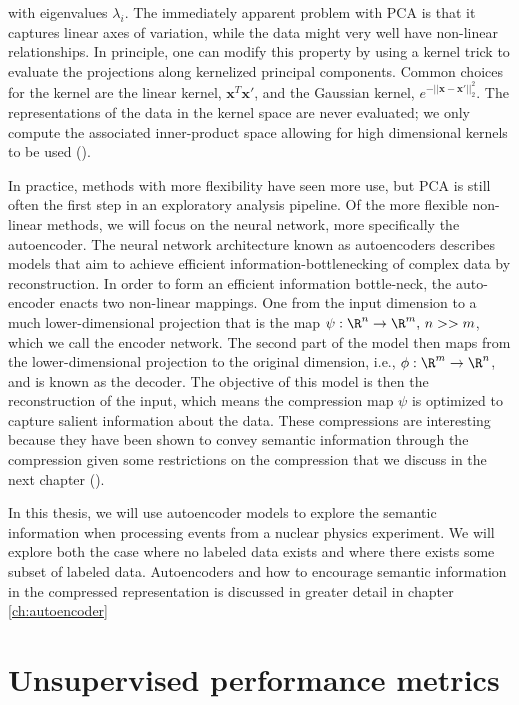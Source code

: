 \noindent with eigenvalues $\lambda_i$. The immediately apparent problem with PCA is that it captures linear axes of variation, while the data might very well have non-linear relationships. In principle, one can modify this property by using a kernel trick to evaluate the projections along kernelized principal components. Common choices for the kernel are the linear kernel, $\mathbf{x}^T\mathbf{x}'$, and the Gaussian kernel, $e^{-||\mathbf{x} - \mathbf{x}'||^2_2}$. The representations of the data in the kernel space are never evaluated; we only compute the associated inner-product space allowing for high dimensional kernels to be used (\cite{Scholkopf1996}). 

In practice, methods with more flexibility have seen more use, but PCA is still often the first step in an exploratory analysis pipeline. Of the more flexible non-linear methods, we will focus on the neural network, more specifically the autoencoder. The neural network architecture known as autoencoders describes models that aim to achieve efficient information-bottlenecking of complex data by reconstruction. In order to form an efficient information bottle-neck, the auto-encoder enacts two non-linear mappings. One from the input dimension to a much lower-dimensional projection that is the map $\psi: \R^n \rightarrow \R^m,\, n >> m$, which we call the encoder network. The second part of the model then maps from the lower-dimensional projection to the original dimension, i.e., $\phi: \R^m \rightarrow \R^n$, and is known as the decoder. The objective of this model is then the reconstruction of the input, which means the compression map $\psi$ is optimized to capture salient information about the data. These compressions are interesting because they have been shown to convey semantic information through the compression given some restrictions on the compression that we discuss in the next chapter (\cite{Fertig}).

In this thesis, we will use autoencoder models to explore the semantic information when processing events from a nuclear physics experiment. We will explore both the case where no labeled data exists and where there exists some subset of labeled data. Autoencoders and how to encourage semantic information in the compressed representation is discussed in greater detail in chapter \ref{ch:autoencoder}

\section{Unsupervised performance metrics}\label{sec:unsupervised_perf}

